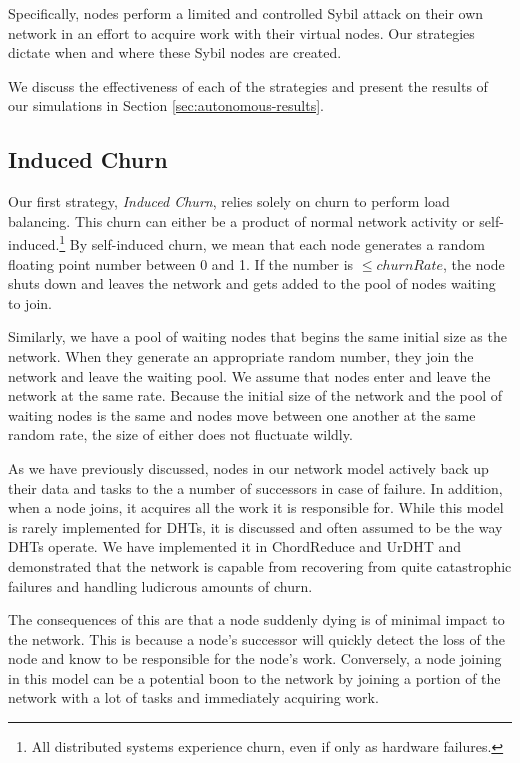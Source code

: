 Specifically, nodes perform a limited and controlled Sybil attack \cite{sybil} on their own network in an effort to acquire work with their virtual nodes.
Our strategies dictate when and where these Sybil nodes are created.

We discuss the effectiveness of each of the strategies and present the results of our simulations in Section \ref{sec:autonomous-results}.



\subsection{Induced Churn}
\label{sec:strat-churn}
Our first strategy, \textit{Induced Churn}, relies solely on churn to perform load balancing.
This churn can either be a product of normal network activity or self-induced.\footnote{All distributed systems experience churn, even if only as hardware failures.}
By self-induced churn, we mean that each node generates a random floating point number between 0 and 1.
If the number is $\leq churnRate$, the node shuts down and leaves the network and gets added to the pool of nodes waiting to join.

Similarly, we have a pool of waiting nodes that begins the same initial size as the network.
When they generate an appropriate random number, they join the network and leave the waiting pool.
We assume that nodes enter and leave the network at the same rate.
Because the initial size of the network and the pool of waiting nodes is the same and nodes move between one another at the same random rate, the size of either does not fluctuate wildly.

As we have previously discussed, nodes in our network model actively back up their data and tasks to the a number of successors in case of failure.
In addition, when a node joins, it acquires all the work it is responsible for.
While this model is rarely implemented for DHTs, it is discussed \cite{kademlia} and often assumed to be the way DHTs operate. 
We have implemented it in ChordReduce\cite{chordreduce} and UrDHT\cite{urdht} and demonstrated that the network is capable from recovering from quite catastrophic failures and handling ludicrous amounts of churn.

The consequences of this are that a node suddenly dying is of minimal impact to the network.
This is because a node's successor will quickly detect the loss of the node and know to be responsible for the node's work.
Conversely, a node joining in this model can be a potential boon to the network by joining a portion of the network with a lot of tasks and immediately acquiring work.


